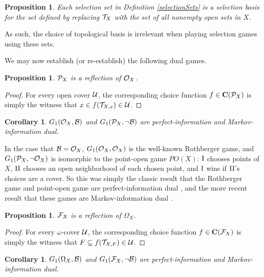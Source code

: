 \documentclass{amsart}
\theoremstyle{plain}
\newtheorem{corollary}[theorem]{Corollary}
\newtheorem{proposition}[theorem]{Proposition}
\theoremstyle{definition}
\theoremstyle{remark}
\theoremstyle{plain}
\theoremstyle{definition}
\theoremstyle{remark}
\begin{document}
\begin{proposition}
  Each selection set in Definition \ref{selectionSets} is a selection basis for the set
  defined by replacing \(\mathcal{T}_X\) with the set of all nonempty open sets in \(X\).
\end{proposition}

As such, the choice of topological basis is irrelevant when playing selection games using these sets.

We may now establish (or re-establish) the following dual games.

\begin{proposition}
  \(\mathcal{P}_X\) is a reflection of \(\mathcal{O}_X\).
\end{proposition}
\begin{proof}
  For every open cover \(\mathcal{U}\), the corresponding choice function \(f\in\mathbf C(\mathcal{P}_X)\) is simply
  the witness that \(x\in f(\mathcal{T}_{X,x})\in\mathcal{U}\).
\end{proof}

\begin{corollary}
  \(G_{1}(\mathcal{O}_X,\mathcal{B})\) and \(G_{1}(\mathcal{P}_X,\neg\mathcal{B})\) are perfect-information
  and Markov-information dual.
\end{corollary}

In the case that \(\mathcal{B}=\mathcal{O}_X\), \(G_{1}(\mathcal{O}_X,\mathcal{O}_X)\) is the well-known Rothberger game,
and \(G_{1}(\mathcal{P}_X,\neg\mathcal{O}_X)\) is isomorphic
to the point-open game \(PO(X)\): \(\mathrm{I}\) chooses points of \(X\), \(\mathrm{II}\) chooses an open neighborhood
of each chosen point, and \(\mathrm{I}\) wins if \(\mathrm{II}\)'s choices are a cover.
So this was simply the classic result that the Rothberger game and
point-open game are perfect-information dual \cite{MR0493925}, and the more recent result that
these games are Markov-information dual \cite{2018arXiv180606001C}.

\begin{proposition}
  \(\mathcal{F}_X\) is a reflection of \(\Omega_X\).
\end{proposition}
\begin{proof}
  For every \(\omega\)-cover \(\mathcal{U}\), the corresponding choice function \(f\in\mathbf C(\mathcal{F}_X)\) is simply
  the witness that \(F\subseteq f(\mathcal{T}_{X,F})\in\mathcal{U}\).
\end{proof}

\begin{corollary}
  \(G_{1}(\Omega_X,\mathcal{B})\) and \(G_{1}(\mathcal{F}_X,\neg\mathcal{B})\) are perfect-information
  and Markov-information dual.
\end{corollary}
\end{document}
